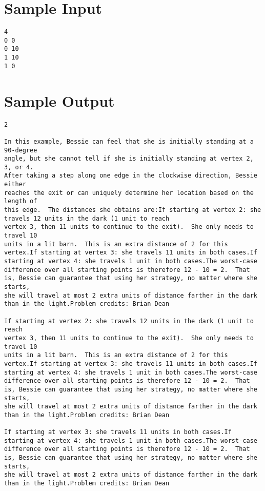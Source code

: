\documentclass[12pt]{article}
\begin{document}
\section*{Sample Input}
\begin{verbatim}
4
0 0
0 10
1 10
1 0
\end{verbatim}

\section*{Sample Output}
\begin{verbatim}
2

In this example, Bessie can feel that she is initially standing at a 90-degree
angle, but she cannot tell if she is initially standing at vertex 2, 3, or 4.
After taking a step along one edge in the clockwise direction, Bessie either
reaches the exit or can uniquely determine her location based on the length of
this edge.  The distances she obtains are:If starting at vertex 2: she travels 12 units in the dark (1 unit to reach
vertex 3, then 11 units to continue to the exit).  She only needs to travel 10
units in a lit barn.  This is an extra distance of 2 for this vertex.If starting at vertex 3: she travels 11 units in both cases.If starting at vertex 4: she travels 1 unit in both cases.The worst-case difference over all starting points is therefore 12 - 10 = 2.  That
is, Bessie can guarantee that using her strategy, no matter where she starts,
she will travel at most 2 extra units of distance farther in the dark than in the light.Problem credits: Brian Dean

If starting at vertex 2: she travels 12 units in the dark (1 unit to reach
vertex 3, then 11 units to continue to the exit).  She only needs to travel 10
units in a lit barn.  This is an extra distance of 2 for this vertex.If starting at vertex 3: she travels 11 units in both cases.If starting at vertex 4: she travels 1 unit in both cases.The worst-case difference over all starting points is therefore 12 - 10 = 2.  That
is, Bessie can guarantee that using her strategy, no matter where she starts,
she will travel at most 2 extra units of distance farther in the dark than in the light.Problem credits: Brian Dean

If starting at vertex 3: she travels 11 units in both cases.If starting at vertex 4: she travels 1 unit in both cases.The worst-case difference over all starting points is therefore 12 - 10 = 2.  That
is, Bessie can guarantee that using her strategy, no matter where she starts,
she will travel at most 2 extra units of distance farther in the dark than in the light.Problem credits: Brian Dean


\end{verbatim}
\end{document}
